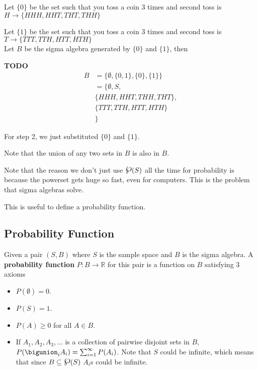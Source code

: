 \documentclass[12pt,letterpaper]{article}
\newcommand{\R}{{\mathbb R}}
\newcommand{\powerset}{\raisebox{.15\baselineskip}{\Large\ensuremath{\wp}}}
\newcommand{\TODO}{\color{red}\textbf{TODO}\color{black}}
\begin{document}
\begin{multicols*}{2}
{            Let $\{0\}$ be the set such that you toss a coin 3 times and second
            toss is $H \rightarrow \{HHH, HHT, THT, THH\}$

            Let $\{1\}$ be the set such that you toss a coin 3 times and second
            toss is $T \rightarrow \{TTT, TTH, HTT, HTH\}$ \\

            Let $B$ be the sigma algebra generated by $\{0\}$ and $\{1\}$, then

            \TODO {Format better}
            \begin{align*}
                B&= \{ \emptyset, \{0, 1\}, \{0\}, \{1\}\} \\
                 &= \{ \emptyset, S, \\
                 &      \{HHH, HHT, THH, THT\}, \\
                 &      \{TTT, TTH, HTT, HTH\} \\
                 &  \}
            \end{align*}

            For step 2, we just substituted $\{0\}$ and $\{1\}$.

            Note that the union of any two sets in $B$ is also in $B$. 
        }

        Note that the reason we don't just use $\powerset(S)$ all the time for
        probability is because the powerset gets huge so fast, even for
        computers. This is the problem that sigma algebras solve.

        This is useful to define a probability function. \\

        \subsection{Probability Function}
        Given a pair $(S, B)$ where $S$ is the sample space and $B$ is the sigma
        algebra. A {\bf probability function} $P: B \rightarrow \R$ for this
        pair is a function on $B$ satisfying 3 axioms

        \begin{itemize}
            \item $P(\emptyset) = 0$.
            \item $P(S) = 1$.
            \item $P(A) \geq 0$ for all $A \in B$.
            \item If $A_1, A_2, A_3, ...$ is a collection of pairwise disjoint
                sets in $B$, $P(\bigunion_{i} A_i) = \sum_{i = 1}^{\infty}
                P(A_i)$. Note that $S$ could be infinite, which means that since
                $B \subseteq \powerset(S)$ $A_i$s could be infinite.
        \end{itemize}

    \end{multicols*}
\end{document}
